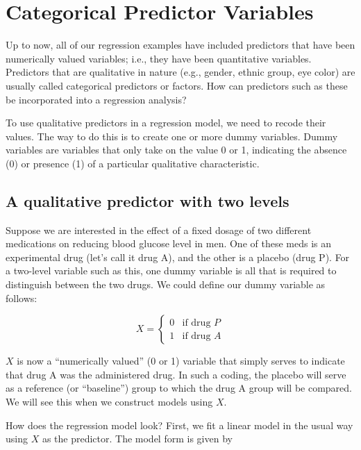 \documentclass[
]{book}
\begin{document}
\hypertarget{categorical-predictor-variables}{%
\section{Categorical Predictor Variables}\label{categorical-predictor-variables}}

Up to now, all of our regression examples have included predictors that have been numerically valued variables; i.e., they have been quantitative variables. Predictors that are qualitative in nature (e.g., gender, ethnic group, eye color) are usually called categorical predictors or factors. How can predictors such as these be incorporated into a regression analysis?

To use qualitative predictors in a regression model, we need to recode their values. The way to do this is to create one or more dummy variables. Dummy variables are variables that only take on the value 0 or 1, indicating the absence (0) or presence (1) of a particular qualitative characteristic.

\hypertarget{a-qualitative-predictor-with-two-levels}{%
\subsection{A qualitative predictor with two levels}\label{a-qualitative-predictor-with-two-levels}}

Suppose we are interested in the effect of a fixed dosage of two different medications on reducing blood glucose level in men. One of these meds is an experimental drug (let's call it drug A), and the other is a placebo (drug P). For a two-level variable such as this, one dummy variable is all that is required to distinguish between the two drugs. We could define our dummy variable as follows:

\[X = \left\{\begin{array}{ll} 0 & \textrm{if drug } P \\ 1 & \textrm{if drug } A\end{array}\right.\]

\(X\) is now a ``numerically valued'' (0 or 1) variable that simply serves to indicate that drug A was the administered drug. In such a coding, the placebo will serve as a reference (or ``baseline'') group to which the drug A group will be compared. We will see this when we construct models using \(X\).

How does the regression model look? First, we fit a linear model in the usual way using \(X\) as the predictor. The model form is given by
\end{document}
